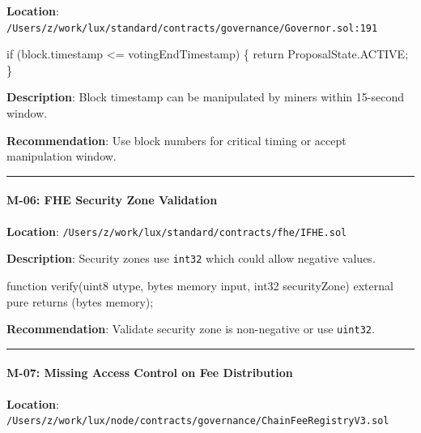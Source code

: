 \documentclass[
]{article}
\newenvironment{Shaded}{}{}
\newcommand{\NormalTok}[1]{#1}
\begin{document}
\textbf{Location}:
\texttt{/Users/z/work/lux/standard/contracts/governance/Governor.sol:191}

\begin{Shaded}
\begin{Highlighting}[]
\NormalTok{if (block.timestamp \textless{}= votingEndTimestamp) \{}
\NormalTok{    return ProposalState.ACTIVE;}
\NormalTok{\}}
\end{Highlighting}
\end{Shaded}

\textbf{Description}: Block timestamp can be manipulated by miners
within 15-second window.

\textbf{Recommendation}: Use block numbers for critical timing or accept
manipulation window.

\begin{center}\rule{0.5\linewidth}{0.5pt}\end{center}

\paragraph{M-06: FHE Security Zone
Validation}\label{m-06-fhe-security-zone-validation}

\textbf{Location}:
\texttt{/Users/z/work/lux/standard/contracts/fhe/IFHE.sol}

\textbf{Description}: Security zones use \texttt{int32} which could
allow negative values.

\begin{Shaded}
\begin{Highlighting}[]
\NormalTok{function verify(uint8 utype, bytes memory input, int32 securityZone) external pure returns (bytes memory);}
\end{Highlighting}
\end{Shaded}

\textbf{Recommendation}: Validate security zone is non-negative or use
\texttt{uint32}.

\begin{center}\rule{0.5\linewidth}{0.5pt}\end{center}

\paragraph{M-07: Missing Access Control on Fee
Distribution}\label{m-07-missing-access-control-on-fee-distribution}

\textbf{Location}:
\texttt{/Users/z/work/lux/node/contracts/governance/ChainFeeRegistryV3.sol}
\end{document}
